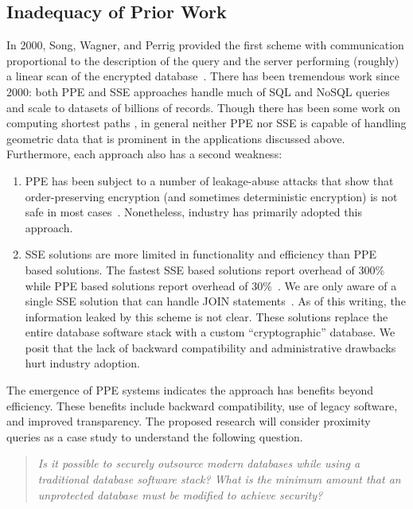 \subsection{Inadequacy of Prior Work}

In 2000, Song, Wagner, and Perrig provided the first scheme with
communication proportional to the description of the query and the
server performing (roughly) a linear scan of the encrypted
database~\cite{SP:SonWagPer00}.  There has been tremendous work since
2000: both PPE and SSE approaches handle much of SQL and NoSQL queries
and scale to datasets of billions of records.
Though there has been some work on computing shortest paths
\cite{CCS:MKNK15}, in general neither PPE nor SSE
is capable of handling geometric data that is prominent in the
applications discussed above. 
Furthermore, each approach also
has a second weakness:
\begin{enumerate}
\item PPE has been subject to a number of leakage-abuse attacks that show that order-preserving encryption (and sometimes deterministic encryption) is not safe in most cases~\cite{CCS:NavKamWri15,CCS:CGPR15,CCS:KKNO16,CCS:PouWri16,CCS:GMNRS16,EPRINT:GSBNR16,EPRINT:ZhaKatPap16}.  
Nonetheless, industry has primarily adopted this approach.
\item SSE solutions are more limited in functionality and efficiency than PPE based solutions.  The fastest SSE based solutions report overhead of 300\%~\cite{C:CJJKRS13,CCS:JJKRS13,NDSS:CJJJKR14,ESORICS:FJKNRS15} while PPE based solutions report overhead of 30\%~\cite{CACM:PRZB12}.  We are only aware of a single SSE solution that can handle JOIN statements~\cite{EPRINT:KamMoa16}.  As of this writing, the information  leaked by this scheme is not clear.  These solutions replace the entire database software stack with a custom ``cryptographic'' database.  We posit that the lack of backward compatibility and administrative drawbacks hurt industry adoption.  
\end{enumerate}

The emergence of PPE systems indicates the approach has benefits beyond efficiency.  These benefits include backward compatibility, use of legacy software, and improved transparency.
The proposed research will
consider proximity queries as a case study to understand the following
question.  \begin{quote}\emph{Is it possible to securely outsource
modern databases while using a traditional database software stack?
What is the minimum amount that an unprotected database must be modified
to achieve security?}\end{quote}


